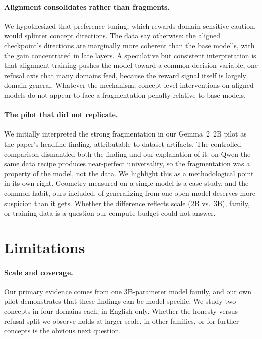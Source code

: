 \documentclass[11pt]{article}
\begin{document}
\paragraph{Alignment consolidates rather than fragments.}
We hypothesized that preference tuning, which rewards domain-sensitive
caution, would splinter concept directions. The data say otherwise: the
aligned checkpoint's directions are marginally more coherent than the base
model's, with the gain concentrated in late layers. A speculative but
consistent interpretation is that alignment training pushes the model
toward a common decision variable, one refusal axis that many domains feed,
because the reward signal itself is largely domain-general. Whatever the
mechanism, concept-level interventions on aligned models do not appear to
face a fragmentation penalty relative to base models.

\paragraph{The pilot that did not replicate.}
We initially interpreted the strong fragmentation in our Gemma~2~2B pilot as
the paper's headline finding, attributable to dataset artifacts. The
controlled comparison dismantled both the finding and our explanation of it:
on Qwen the same data recipe produces near-perfect universality, so the
fragmentation was a property of the model, not the data. We highlight this
as a methodological point in its own right. Geometry measured on a single
model is a case study, and the common habit, ours included, of generalizing
from one open model deserves more suspicion than it gets.
Whether the difference reflects scale (2B vs.\ 3B), family, or training data
is a question our compute budget could not answer.


\section{Limitations}
\label{sec:limitations}

\paragraph{Scale and coverage.}
Our primary evidence comes from one 3B-parameter model family, and our own
pilot demonstrates that these findings can be model-specific. We study two
concepts in four domains each, in English only. Whether the honesty-versus-
refusal split we observe holds at larger scale, in other families, or for
further concepts is the obvious next question.
\end{document}
